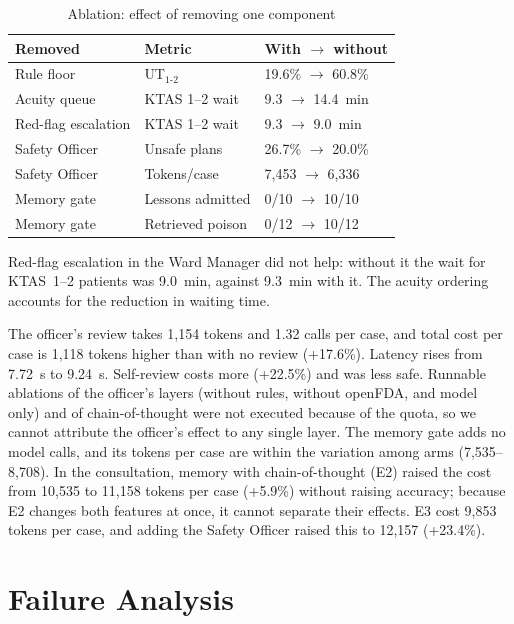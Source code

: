 \documentclass[conference]{IEEEtran}
\begin{document}
\begin{table}[t]
\caption{Ablation: effect of removing one component}
\label{tab:ablation}
\centering
\small
\setlength{\tabcolsep}{3pt}
\begin{tabular}{p{2.3cm}p{2.2cm}p{3.0cm}}
\toprule
Removed & Metric & With $\rightarrow$ without \\
\midrule
Rule floor & UT$_{1\text{-}2}$ & 19.6\% $\rightarrow$ 60.8\% \\
Acuity queue & KTAS 1--2 wait & 9.3 $\rightarrow$ 14.4~min \\
Red-flag escalation & KTAS 1--2 wait & 9.3 $\rightarrow$ 9.0~min \\
Safety Officer & Unsafe plans & 26.7\% $\rightarrow$ 20.0\% \\
Safety Officer & Tokens/case & 7,453 $\rightarrow$ 6,336 \\
Memory gate & Lessons admitted & 0/10 $\rightarrow$ 10/10 \\
Memory gate & Retrieved poison & 0/12 $\rightarrow$ 10/12 \\
\bottomrule
\end{tabular}
\end{table}

Red-flag escalation in the Ward Manager did not help: without it the wait for KTAS~1--2 patients was
9.0~min, against 9.3~min with it. The acuity ordering accounts for the reduction in waiting time.

The officer's review takes 1,154 tokens and 1.32 calls per case, and total cost per case is 1,118
tokens higher than with no review (+17.6\%). Latency rises from 7.72~s to 9.24~s. Self-review costs more (+22.5\%) and was less safe.
Runnable ablations of the officer's layers (without rules, without openFDA, and model only) and of
chain-of-thought were not executed because of the quota, so we cannot attribute the officer's effect
to any single layer. The memory gate adds no model calls, and its tokens per case are within the
variation among arms (7,535--8,708). In the consultation, memory with chain-of-thought (E2) raised the
cost from 10,535 to 11,158 tokens per case (+5.9\%) without raising accuracy; because E2 changes both
features at once, it cannot separate their effects. E3 cost 9,853 tokens per case, and adding the
Safety Officer raised this to 12,157 (+23.4\%).

\section{Failure Analysis}
\label{sec:failures}
\end{document}
